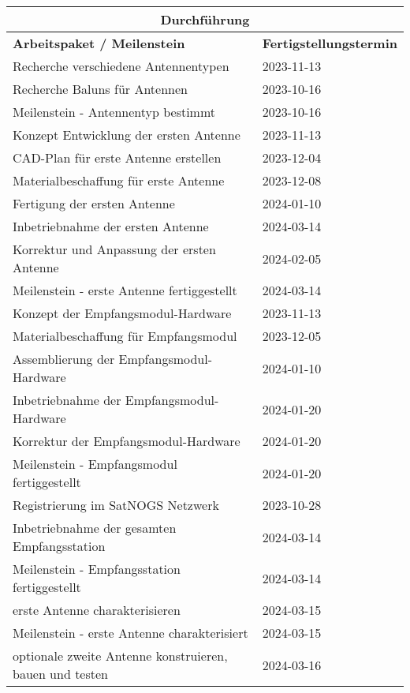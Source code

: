 \begin{table}[h]
	\begin{tabular}{|p{.6\linewidth}|p{.3\linewidth}|}
		\multicolumn{2}{c}{\textbf{Durchführung}} \\ \hline
		\textbf{Arbeitspaket / Meilenstein} & \textbf{Fertigstellungstermin} \\ \hline
		Recherche verschiedene Antennentypen & 2023-11-13 \\ \hline
		Recherche Baluns für Antennen & 2023-10-16 \\ \hline
		Meilenstein - Antennentyp bestimmt & 2023-10-16 \\ \hline
		Konzept Entwicklung der ersten Antenne & 2023-11-13 \\ \hline
		CAD-Plan für erste Antenne erstellen & 2023-12-04 \\ \hline
		Materialbeschaffung für erste Antenne & 2023-12-08 \\ \hline
		Fertigung der ersten Antenne & 2024-01-10 \\ \hline
		Inbetriebnahme der ersten Antenne & 2024-03-14 \\ \hline
		Korrektur und Anpassung der ersten Antenne & 2024-02-05 \\ \hline
		Meilenstein - erste Antenne fertiggestellt & 2024-03-14 \\ \hline
		Konzept der Empfangsmodul-Hardware & 2023-11-13 \\ \hline
		Materialbeschaffung für Empfangsmodul & 2023-12-05 \\ \hline
		Assemblierung der Empfangsmodul-Hardware & 2024-01-10 \\ \hline
		Inbetriebnahme der Empfangsmodul-Hardware & 2024-01-20 \\ \hline
		Korrektur der Empfangsmodul-Hardware & 2024-01-20 \\ \hline
		Meilenstein - Empfangsmodul fertiggestellt & 2024-01-20 \\ \hline
		Registrierung im SatNOGS Netzwerk & 2023-10-28 \\ \hline
		Inbetriebnahme der gesamten Empfangsstation & 2024-03-14 \\ \hline
		Meilenstein - Empfangsstation fertiggestellt & 2024-03-14 \\ \hline
		erste Antenne charakterisieren & 2024-03-15 \\ \hline
		Meilenstein - erste Antenne charakterisiert & 2024-03-15 \\ \hline
		optionale zweite Antenne konstruieren, bauen und testen & 2024-03-16 \\ \hline
	\end{tabular}
\end{table}
